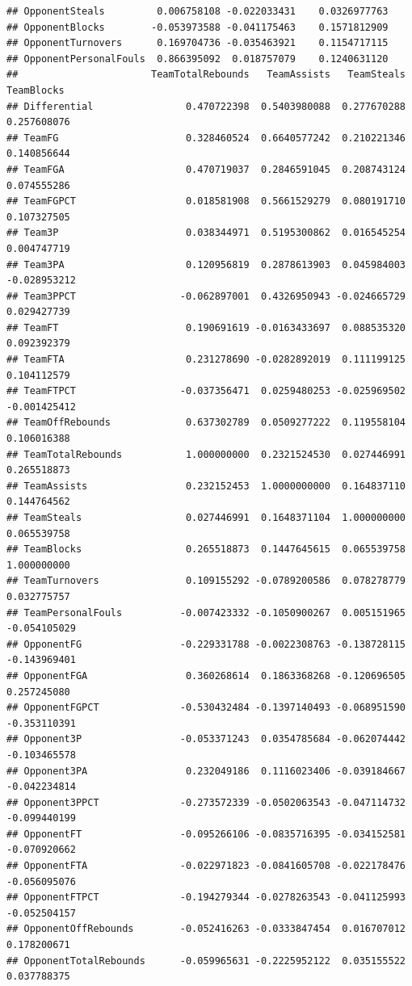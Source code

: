 \documentclass[
]{book}
\begin{document}
\begin{verbatim}
## OpponentSteals         0.006758108 -0.022033431    0.0326977763
## OpponentBlocks        -0.053973588 -0.041175463    0.1571812909
## OpponentTurnovers      0.169704736 -0.035463921    0.1154717115
## OpponentPersonalFouls  0.866395092  0.018757079    0.1240631120
##                       TeamTotalRebounds   TeamAssists   TeamSteals   TeamBlocks
## Differential                0.470722398  0.5403980088  0.277670288  0.257608076
## TeamFG                      0.328460524  0.6640577242  0.210221346  0.140856644
## TeamFGA                     0.470719037  0.2846591045  0.208743124  0.074555286
## TeamFGPCT                   0.018581908  0.5661529279  0.080191710  0.107327505
## Team3P                      0.038344971  0.5195300862  0.016545254  0.004747719
## Team3PA                     0.120956819  0.2878613903  0.045984003 -0.028953212
## Team3PPCT                  -0.062897001  0.4326950943 -0.024665729  0.029427739
## TeamFT                      0.190691619 -0.0163433697  0.088535320  0.092392379
## TeamFTA                     0.231278690 -0.0282892019  0.111199125  0.104112579
## TeamFTPCT                  -0.037356471  0.0259480253 -0.025969502 -0.001425412
## TeamOffRebounds             0.637302789  0.0509277222  0.119558104  0.106016388
## TeamTotalRebounds           1.000000000  0.2321524530  0.027446991  0.265518873
## TeamAssists                 0.232152453  1.0000000000  0.164837110  0.144764562
## TeamSteals                  0.027446991  0.1648371104  1.000000000  0.065539758
## TeamBlocks                  0.265518873  0.1447645615  0.065539758  1.000000000
## TeamTurnovers               0.109155292 -0.0789200586  0.078278779  0.032775757
## TeamPersonalFouls          -0.007423332 -0.1050900267  0.005151965 -0.054105029
## OpponentFG                 -0.229331788 -0.0022308763 -0.138728115 -0.143969401
## OpponentFGA                 0.360268614  0.1863368268 -0.120696505  0.257245080
## OpponentFGPCT              -0.530432484 -0.1397140493 -0.068951590 -0.353110391
## Opponent3P                 -0.053371243  0.0354785684 -0.062074442 -0.103465578
## Opponent3PA                 0.232049186  0.1116023406 -0.039184667 -0.042234814
## Opponent3PPCT              -0.273572339 -0.0502063543 -0.047114732 -0.099440199
## OpponentFT                 -0.095266106 -0.0835716395 -0.034152581 -0.070920662
## OpponentFTA                -0.022971823 -0.0841605708 -0.022178476 -0.056095076
## OpponentFTPCT              -0.194279344 -0.0278263543 -0.041125993 -0.052504157
## OpponentOffRebounds        -0.052416263 -0.0333847454  0.016707012  0.178200671
## OpponentTotalRebounds      -0.059965631 -0.2225952122  0.035155522  0.037788375

\end{verbatim}
\end{document}
